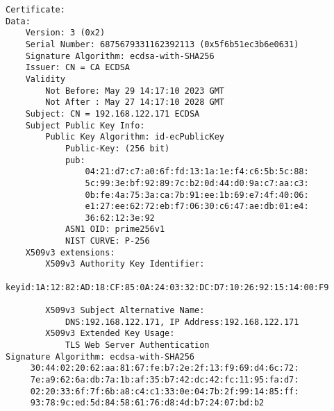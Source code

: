 \documentclass[
10pt, %
a4paper, %
oneside, %
headinclude,footinclude, %
BCOR5mm, %
]{scrartcl}
\begin{document}
\begin{lstlisting}
Certificate:
Data:
    Version: 3 (0x2)
    Serial Number: 6875679331162392113 (0x5f6b51ec3b6e0631)
    Signature Algorithm: ecdsa-with-SHA256
    Issuer: CN = CA ECDSA
    Validity
        Not Before: May 29 14:17:10 2023 GMT
        Not After : May 27 14:17:10 2028 GMT
    Subject: CN = 192.168.122.171 ECDSA
    Subject Public Key Info:
        Public Key Algorithm: id-ecPublicKey
            Public-Key: (256 bit)
            pub:
                04:21:d7:c7:a0:6f:fd:13:1a:1e:f4:c6:5b:5c:88:
                5c:99:3e:bf:92:89:7c:b2:0d:44:d0:9a:c7:aa:c3:
                0b:fe:4a:75:3a:ca:7b:91:ee:1b:69:e7:4f:40:06:
                e1:27:ee:62:72:eb:f7:06:30:c6:47:ae:db:01:e4:
                36:62:12:3e:92
            ASN1 OID: prime256v1
            NIST CURVE: P-256
    X509v3 extensions:
        X509v3 Authority Key Identifier: 
            keyid:1A:12:82:AD:18:CF:85:0A:24:03:32:DC:D7:10:26:92:15:14:00:F9

        X509v3 Subject Alternative Name: 
            DNS:192.168.122.171, IP Address:192.168.122.171
        X509v3 Extended Key Usage: 
            TLS Web Server Authentication
Signature Algorithm: ecdsa-with-SHA256
     30:44:02:20:62:aa:81:67:fe:b7:2e:2f:13:f9:69:d4:6c:72:
     7e:a9:62:6a:db:7a:1b:af:35:b7:42:dc:42:fc:11:95:fa:d7:
     02:20:33:6f:7f:6b:a8:c4:c1:33:0e:04:7b:2f:99:14:85:ff:
     93:78:9c:ed:5d:84:58:61:76:d8:4d:b7:24:07:bd:b2

\end{lstlisting}





\newpage
\renewcommand{\refname}{\spacedlowsmallcaps{References}} 


 
\end{document}
